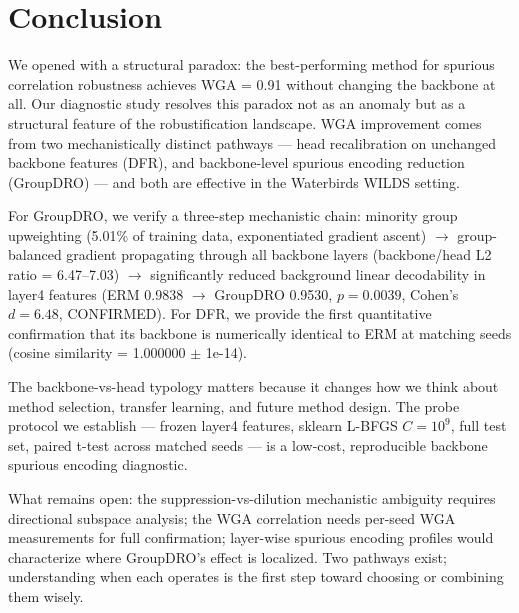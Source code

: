 \section{Conclusion}
\label{sec:conclusion}

We opened with a structural paradox: the best-performing method for spurious correlation robustness achieves WGA = 0.91 without changing the backbone at all. Our diagnostic study resolves this paradox not as an anomaly but as a structural feature of the robustification landscape. WGA improvement comes from two mechanistically distinct pathways --- head recalibration on unchanged backbone features (DFR), and backbone-level spurious encoding reduction (GroupDRO) --- and both are effective in the Waterbirds WILDS setting.

For GroupDRO, we verify a three-step mechanistic chain: minority group upweighting (5.01\% of training data, exponentiated gradient ascent) $\to$ group-balanced gradient propagating through all backbone layers (backbone/head L2 ratio = 6.47--7.03) $\to$ significantly reduced background linear decodability in layer4 features (ERM 0.9838 $\to$ GroupDRO 0.9530, $p = 0.0039$, Cohen's $d = 6.48$, CONFIRMED). For DFR, we provide the first quantitative confirmation that its backbone is numerically identical to ERM at matching seeds (cosine similarity = 1.000000 $\pm$ 1e-14).

The backbone-vs-head typology matters because it changes how we think about method selection, transfer learning, and future method design. The probe protocol we establish --- frozen layer4 features, sklearn L-BFGS $C=10^9$, full test set, paired t-test across matched seeds --- is a low-cost, reproducible backbone spurious encoding diagnostic.

What remains open: the suppression-vs-dilution mechanistic ambiguity requires directional subspace analysis; the WGA correlation needs per-seed WGA measurements for full confirmation; layer-wise spurious encoding profiles would characterize where GroupDRO's effect is localized. Two pathways exist; understanding when each operates is the first step toward choosing or combining them wisely.
